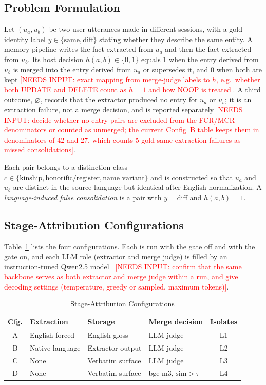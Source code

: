 \documentclass[conference]{IEEEtran}
\newcommand{\pending}[1]{\textcolor{red}{#1}}
\begin{document}
\subsection{Problem Formulation}

Let $(u_a, u_b)$ be two user utterances made in different sessions, with a
gold identity label $y \in \{\mathrm{same}, \mathrm{diff}\}$ stating
whether they describe the same entity. A memory pipeline writes the fact
extracted from $u_a$ and then the fact extracted from $u_b$. Its host
decision $h(a,b) \in \{0,1\}$ equals 1 when the entry derived from $u_b$
is merged into the entry derived from $u_a$ or supersedes it, and 0 when
both are kept
\pending{[NEEDS INPUT: exact mapping from merge-judge labels to $h$, e.g.\
whether both UPDATE and DELETE count as $h=1$ and how NOOP is treated]}.
A third outcome, $\varnothing$, records that the extractor produced no
entry for $u_a$ or $u_b$; it is an extraction failure, not a merge
decision, and is reported separately
\pending{[NEEDS INPUT: decide whether no-entry pairs are excluded from the
FCR/MCR denominators or counted as unmerged; the current Config~B table
keeps them in denominators of 42 and 27, which counts 5 gold-same
extraction failures as missed consolidations]}.

Each pair belongs to a distinction class
$c \in \{\text{kinship}, \text{honorific/register}, \text{name variant}\}$
and is constructed so that $u_a$ and $u_b$ are distinct in the source
language but identical after English normalization. A
\emph{language-induced false consolidation} is a pair with
$y = \mathrm{diff}$ and $h(a,b) = 1$.

\subsection{Stage-Attribution Configurations}

Table~\ref{tab:configs} lists the four configurations. Each is run with the
gate off and with the gate on, and each LLM role (extractor and merge
judge) is filled by an instruction-tuned Qwen2.5 model~\cite{qwen25}
\pending{[NEEDS INPUT: confirm that the same backbone serves as both
extractor and merge judge within a run, and give decoding settings
(temperature, greedy or sampled, maximum tokens)]}.

\begin{table}[t]
\caption{Stage-Attribution Configurations}
\label{tab:configs}
\centering
\footnotesize
\renewcommand{\arraystretch}{1.15}
\setlength{\tabcolsep}{4pt}
\begin{tabular}{|c|l|l|l|c|}
\hline
\textbf{Cfg.} & \textbf{Extraction} & \textbf{Storage} & \textbf{Merge decision} & \textbf{Isolates}\\
\hline
A & English-forced & English gloss & LLM judge & L1\\
B & Native-language & Extractor output & LLM judge & L2\\
C & None & Verbatim surface & LLM judge & L3\\
D & None & Verbatim surface & bge-m3, $\mathrm{sim} > \tau$ & L4\\
\hline
\end{tabular}
\end{table}
\end{document}
